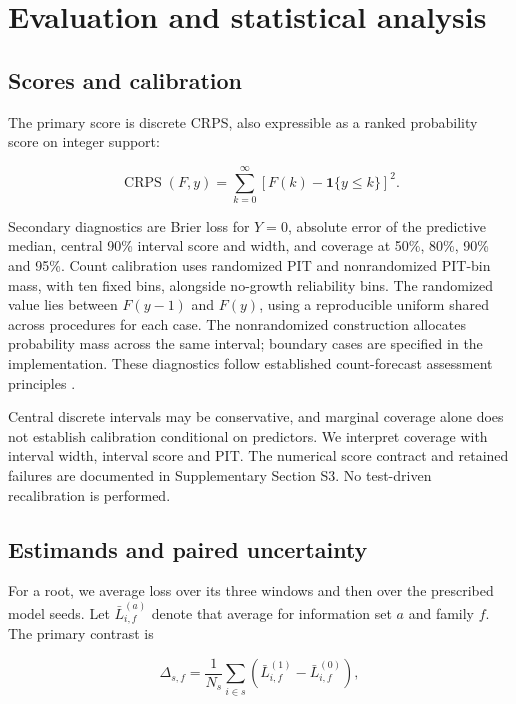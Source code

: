 \hypertarget{evaluation-and-statistical-analysis}{%
\section{Evaluation and statistical analysis}}

\hypertarget{scores-and-calibration}{%
\subsection{Scores and calibration}}

The primary score is discrete CRPS, also expressible as a ranked probability score on integer support:

\[
\operatorname{CRPS}(F,y)=\sum_{k=0}^{\infty}\left[F(k)-\mathbf1\{y\le k\}\right]^2.
\]

Secondary diagnostics are Brier loss \cite{brier1950} for \(Y=0\), absolute error of the predictive median, central 90\% interval score and width, and coverage at 50\%, 80\%, 90\% and 95\%. Count calibration uses randomized PIT and nonrandomized PIT-bin mass, with ten fixed bins, alongside no-growth reliability bins. The randomized value lies between \(F(y-1)\) and \(F(y)\), using a reproducible uniform shared across procedures for each case. The nonrandomized construction allocates probability mass across the same interval; boundary cases are specified in the implementation. These diagnostics follow established count-forecast assessment principles \cite{czado2009}.

Central discrete intervals may be conservative, and marginal coverage alone does not establish calibration conditional on predictors. We interpret coverage with interval width, interval score and PIT. The numerical score contract and retained failures are documented in Supplementary Section S3. No test-driven recalibration is performed.

\hypertarget{estimands-and-paired-uncertainty}{%
\subsection{Estimands and paired uncertainty}}

For a root, we average loss over its three windows and then over the prescribed model seeds. Let \(\bar L^{(a)}_{i,f}\) denote that average for information set \(a\) and family \(f\). The primary contrast is

\[
\Delta_{s,f}=\frac{1}{N_s}\sum_{i\in s}\left(\bar L^{(1)}_{i,f}-\bar L^{(0)}_{i,f}\right),
\]

